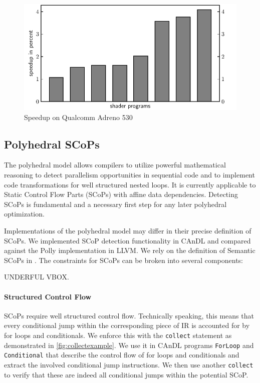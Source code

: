 \begin{figure}[ht]
\centering
\includegraphics[width=\linewidth]{figures/qualcomm_plot.pdf}
\caption{Speedup on Qualcomm Adreno 530}
\label{fig:qualcommspeedup}
\end{figure}

\subsection{Polyhedral SCoPs}

    The polyhedral model allows compilers to utilize powerful mathematical
    reasoning to detect parallelism opportunities in sequential code and to
    implement code transformations for well structured nested
    loops.
    It is currently applicable to Static Control Flow Parts (SCoPs) with affine
    data dependencies.
    Detecting SCoPs is fundamental and a necessary first step for any later
    polyhedral optimization.

    Implementations of the polyhedral model may differ in their precise
    definition of SCoPs.
    We implemented SCoP detection functionality in CAnDL and compared against
    the Polly implementation in LLVM.
    We rely on the definition of Semantic SCoPs in \citet{Lengauer2012Polly}.
    The constraints for SCoPs can be broken into several components:

    UNDERFUL VBOX.


    \paragraph{Structured Control Flow}
    SCoPs require well structured control flow.
    Technically speaking, this means that every conditional jump within the
    corresponding piece of IR is accounted for by for loops and conditionals.
    We enforce this with the \texttt{collect} statement as demonstrated in
    \autoref{fig:collectexample}.
    We use it in CAnDL programs \texttt{ForLoop} and
    \texttt{Conditional} that describe the control flow of for loops and
    conditionals and extract the involved conditional jump instructions.
    We then use another \texttt{collect} to verify that these are indeed all
    conditional jumps within the potential SCoP.

